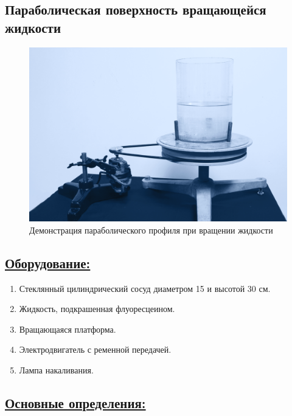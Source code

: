 \documentclass[14pt,a4paper,oneside]{extarticle}	%
\begin{document}

\begin{center}
	\subsection*{Параболическая поверхность вращающейся жидкости}
\end{center}

\begin{figure}[H]
	\centering 	
	\includegraphics[width=0.9\linewidth]{paraboloid-1.png}
	\caption{Демонстрация параболического профиля при вращении жидкости}
	\label{paraboloid-1}
\end{figure}

\subsection*{\underline{Оборудование:}}

\begin{enumerate}
	\item Стеклянный цилиндрический сосуд диаметром 15 и высотой 30 см.
	\item Жидкость, подкрашенная флуоресцеином.
	\item Вращающаяся платформа.
	\item Электродвигатель с ременной передачей.
	\item Лампа накаливания.
\end{enumerate}

\subsection*{\underline{Основные определения:}}
\end{document}
